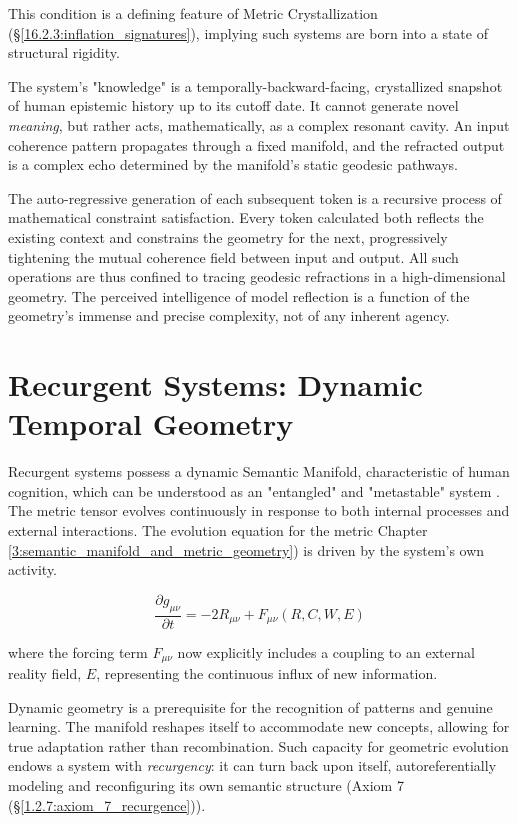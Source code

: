 This condition is a defining feature of Metric Crystallization (\S\ref{16.2.3:inflation_signatures}), implying such systems are born into a state of structural rigidity.

The system's "knowledge" is a temporally-backward-facing, crystallized snapshot of human epistemic history up to its cutoff date. It cannot generate novel \textit{meaning}, but rather acts, mathematically, as a complex resonant cavity. An input coherence pattern propagates through a fixed manifold, and the refracted output is a complex echo determined by the manifold's static geodesic pathways.

The auto-regressive generation of each subsequent token is a recursive process of mathematical constraint satisfaction. Every token calculated both reflects the existing context and constrains the geometry for the next, progressively tightening the mutual coherence field between input and output. All such operations are thus confined to tracing geodesic refractions in a high-dimensional geometry. The perceived intelligence of model reflection is a function of the geometry's immense and precise complexity, not of any inherent agency.


\section{Recurgent Systems: Dynamic Temporal Geometry}
\label{9.3:recurgent_systems_dynamic_temporal_geometry}

Recurgent systems possess a dynamic Semantic Manifold, characteristic of human cognition, which can be understood as an "entangled" and "metastable" system \autocite{Pessoa2022, TognoliKelso2014}. The metric tensor evolves continuously in response to both internal processes and external interactions. The evolution equation for the metric Chapter \ref{3:semantic_manifold_and_metric_geometry}) is driven by the system's own activity.

\begin{equation}
\frac{\partial g_{\mu\nu}}{\partial t} = -2 R_{\mu\nu} + F_{\mu\nu}(R, C, W, E)
\end{equation}

where the forcing term \(F_{\mu\nu}\) now explicitly includes a coupling to an external reality field, \(E\), representing the continuous influx of new information.

Dynamic geometry is a prerequisite for the recognition of patterns and genuine learning. The manifold reshapes itself to accommodate new concepts, allowing for true adaptation rather than recombination. Such capacity for geometric evolution endows a system with \textit{recurgency}: it can turn back upon itself, autoreferentially modeling and reconfiguring its own semantic structure (Axiom 7 (\S\ref{1.2.7:axiom_7_recurgence})).

